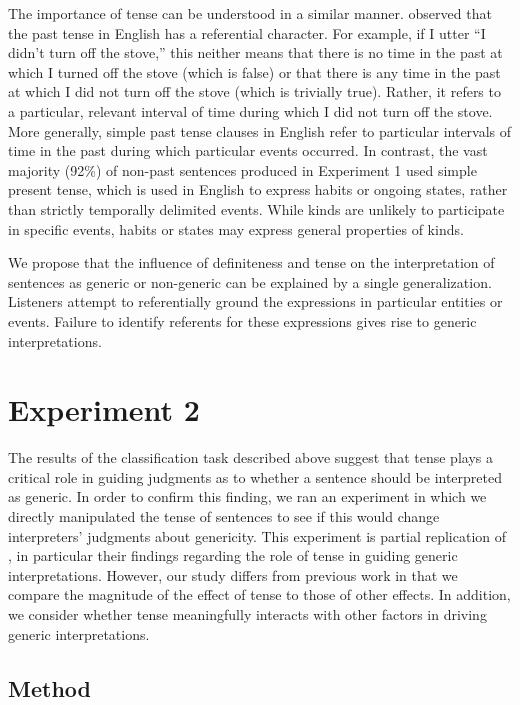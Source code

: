 \documentclass[10pt,letterpaper]{article}
\begin{document}
The importance of tense can be understood in a similar manner.  observed that the past tense in English has a referential character. For example, if I utter ``I didn't turn off the stove,'' this neither means that there is no time in the past at which I turned off the stove (which is false) or that there is any time in the past at which I did not turn off the stove (which is trivially true). Rather, it refers to a particular, relevant interval of time during which I did not turn off the stove. More generally, simple past tense clauses in English refer to particular intervals of time in the past during which particular events occurred. In contrast, the vast majority (92\%) of non-past sentences produced in Experiment 1 used simple present tense, which is used in English to express habits or ongoing states, rather than strictly temporally delimited events. While kinds are unlikely to participate in specific events, habits or states may express general properties of kinds.

We propose that the influence of definiteness and tense on the interpretation of sentences as generic or non-generic can be explained by a single generalization. Listeners attempt to referentially ground the expressions in particular entities or events. Failure to identify referents for these expressions gives rise to generic interpretations.

\section{Experiment 2}

The results of the classification task described above suggest that tense plays a critical role in guiding judgments as to whether a sentence should be interpreted as generic. In order to confirm this finding, we ran an experiment in which we directly manipulated the tense of sentences to see if this would change interpreters' judgments about genericity. This experiment is partial replication of , in particular their findings regarding the role of tense in guiding generic interpretations. However, our study differs from previous work in that we compare the magnitude of the effect of tense to those of other effects. In addition, we consider whether tense meaningfully interacts with other factors in driving generic interpretations.

\subsection{Method}
\end{document}
